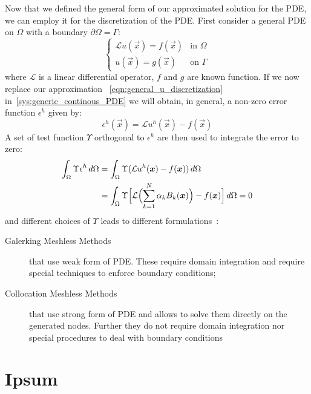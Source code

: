 Now that we defined the general form of our approximated solution for the PDE, we can employ it for the discretization of the PDE.
First consider a general PDE on $\Omega$ with a boundary $\partial\Omega=\Gamma$:
\begin{equation}
	\label{sys:generic_continous_PDE}
	\begin{cases}
		\mathcal{L} u(\vec{x})  = f(\vec{x})		& \text{in $\Omega$} \\
		u(\vec{x}) 							   = g(\vec{x})	 & \text{on $\Gamma$}
	\end{cases}
\end{equation}
where $\mathcal{L}$ is a linear differential operator, $f$ and $g$ are known function. If  we now replace our approximation ~\eqref{eqn:general_u_discretization} in~\eqref{sys:generic_continous_PDE} we will obtain, in general, a non-zero error function $\epsilon^{h}$ given by:
\begin{equation}
	\epsilon^{h}(\vec{x}) = \mathcal{L} u^{h}(\vec{x}) - f(\vec{x})
\end{equation}
A set of test function $\Upsilon$ orthogonal to $\epsilon^{h}$ are then used to integrate the error to zero:
\begin{equation}
	\begin{split}
		\int_{\Omega} \Upsilon \epsilon^{h}\,d\Omega & = \int_{\Omega} \Upsilon (\mathcal{L} u^{h}(\vec{x}) - f(\vec{x}))\,d\Omega  \\
		& = \int_{\Omega} \Upsilon \Bigl[ \mathcal{L}\Bigl( \sum_{k= 1}^{N} {\alpha_k B_k(\vec{x})}\Bigr) - f(\vec{x})\Bigr]\,d\Omega = 0
	\end{split}
\end{equation}
and different choices of $\Upsilon$ leads to different formulations~\cite{Chen:meshless_overview_after_20_years}:
\begin{description}
	\item[Galerking Meshless Methods] that use weak form of PDE. These require domain integration and require special techniques to enforce boundary conditions;
	\item[Collocation Meshless Methods] that use strong form of PDE and allows to solve them directly on the generated nodes. Further they do not require domain integration nor special procedures to deal with boundary conditions
\end{description}

\section{Ipsum}

